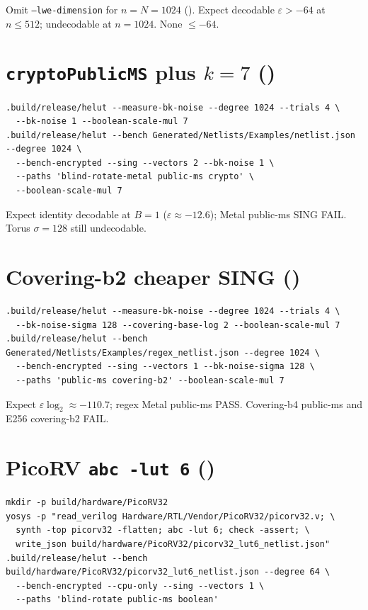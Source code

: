 Omit \texttt{--lwe-dimension} for $n{=}N{=}1024$ (). Expect
decodable $\varepsilon>-64$ at $n\le 512$; undecodable at $n{=}1024$.
None $\le -64$.

\section{\texttt{cryptoPublicMS} plus $k{=}7$ ()}

\begin{lstlisting}
.build/release/helut --measure-bk-noise --degree 1024 --trials 4 \
  --bk-noise 1 --boolean-scale-mul 7
.build/release/helut --bench Generated/Netlists/Examples/netlist.json --degree 1024 \
  --bench-encrypted --sing --vectors 2 --bk-noise 1 \
  --paths 'blind-rotate-metal public-ms crypto' \
  --boolean-scale-mul 7
\end{lstlisting}

Expect identity decodable at $B{=}1$ ($\varepsilon\approx-12.6$); Metal
public-ms SING FAIL. Torus $\sigma{=}128$ still undecodable.

\section{Covering-b2 cheaper SING ()}

\begin{lstlisting}
.build/release/helut --measure-bk-noise --degree 1024 --trials 4 \
  --bk-noise-sigma 128 --covering-base-log 2 --boolean-scale-mul 7
.build/release/helut --bench Generated/Netlists/Examples/regex_netlist.json --degree 1024 \
  --bench-encrypted --sing --vectors 1 --bk-noise-sigma 128 \
  --paths 'public-ms covering-b2' --boolean-scale-mul 7
\end{lstlisting}

Expect $\varepsilon\log_2\approx-110.7$; regex Metal public-ms PASS.
Covering-b4 public-ms and E256 covering-b2 FAIL.

\section{PicoRV \texttt{abc -lut 6} (\cid{58})}

\begin{lstlisting}
mkdir -p build/hardware/PicoRV32
yosys -p "read_verilog Hardware/RTL/Vendor/PicoRV32/picorv32.v; \
  synth -top picorv32 -flatten; abc -lut 6; check -assert; \
  write_json build/hardware/PicoRV32/picorv32_lut6_netlist.json"
.build/release/helut --bench build/hardware/PicoRV32/picorv32_lut6_netlist.json --degree 64 \
  --bench-encrypted --cpu-only --sing --vectors 1 \
  --paths 'blind-rotate public-ms boolean'
\end{lstlisting}

